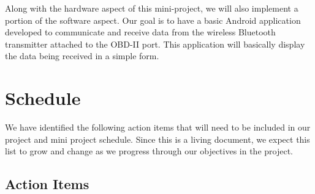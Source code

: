 \documentclass[12pt]{article}
\begin{document}
Along with the hardware aspect of this mini-project, we will also implement a portion of the software aspect. Our goal is to have a basic Android application developed to communicate and receive data from the wireless Bluetooth transmitter attached to the OBD-II port. This application will basically display the data being received in a simple form.

\section{Schedule}\label{sec:Schedule}

We have identified the following action items that will need to be included in our project and mini project schedule.  Since this is a living document, we expect this list to grow and change as we progress through our objectives in the project.

\subsection{Action Items}\label{subsec:ActionItems}
\end{document}
